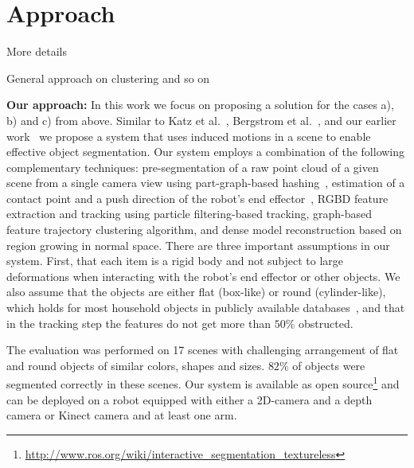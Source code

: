 \section{Approach}
\item More details
\item General approach on clustering and so on	 

\textbf{Our approach:} In this work we focus on proposing a solution for the cases a), b) and c) from above.
Similar  to Katz  et al.~\cite{Katz-WS-MM-ICRA2011}, Bergstrom et
al.~\cite{bergstrom11icvs}, and our earlier
work~\cite{bersch12interactive} we propose a system that uses
induced motions  in a scene to enable effective
object  segmentation.   Our  system   employs  a  combination  of  the
following  complementary techniques: pre-segmentation of a raw point cloud of a given scene from a single camera
view using part-graph-based hashing~\cite{marton12SC}, estimation
of a contact  point and a push direction of the robot's end effector~\cite{bersch12interactive}, RGBD feature
extraction and tracking using particle filtering-based tracking, graph-based feature trajectory 
clustering algorithm, and dense model reconstruction based on region growing in normal space.
There are three important assumptions in our system. First, that each item is a rigid  body and not subject
to large deformations when  interacting with  the robot's  end  effector or
other objects. We also assume that the objects are either flat (box-like) or round (cylinder-like),
which holds for most household objects in publicly available databases~\cite{marton11ijrr}, and
that in the tracking step the features do not get more than $50\%$ obstructed.

The evaluation was performed on 17 scenes with challenging arrangement of flat and
round objects of similar colors, shapes and sizes. $82\%$ of objects
were segmented correctly in these scenes.  Our system   is
available  as open source\footnote{\url{http://www.ros.org/wiki/interactive_segmentation_textureless}}
and can  be deployed  on a  robot equipped with either a 2D-camera and a depth
camera or Kinect camera and at least one arm.


